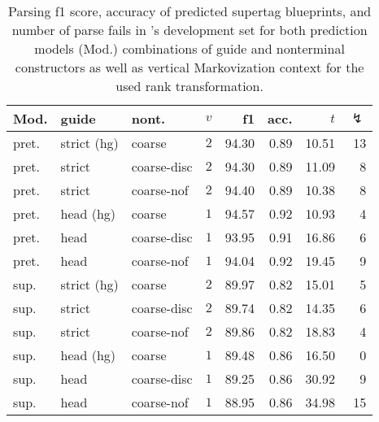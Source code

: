 \documentclass[../../document.tex]{subfiles}
\begin{document}
    \begin{table}
        \caption{\label{tbl:experiments:dptb:dcp}
        Parsing f1 score, accuracy of predicted  supertag blueprints, and number of parse fails in 's development set for both prediction models (Mod.) combinations of guide and nonterminal constructors as well as vertical Markovization context for the used rank transformation.
        }
        \centering
        \setlength{\tabcolsep}{4pt}
        \vspace{.2cm}
        \begin{tabular}{lllc|rrrr}
            \toprule
Mod. &  guide &   nont.   &\(v\)   & f1 & acc. & $t$ & $\lightning$ \\ \hline \rowcolor{black!10}
pret. & strict (hg) &  coarse & \(2\)  & 94.30 & 0.89 & 10.51 & 13  \\\hline
pret. & strict      &  coarse-disc  & \(2\)  & 94.30 & 0.89 & 11.09 & 8  \\
pret. & strict      &  coarse-nof & \(2\)  & 94.40 & 0.89 & 10.38 & 8  \\ \hline\rowcolor{black!10}
pret. & head  (hg)  &  coarse & \(1\)  & 94.57 & 0.92 & 10.93 & 4  \\\hline
pret. & head        &  coarse-disc & \(1\)  & 93.95 & 0.91 & 16.86 & 6  \\
pret. & head        &  coarse-nof & \(1\)  & 94.04 & 0.92 & 19.45 & 9  \\
\midrule \rowcolor{black!10}
sup. & strict (hg) &  coarse & \(2\)  & 89.97 & 0.82 & 15.01 & 5  \\\hline
sup. & strict    &  coarse-disc & \(2\)  & 89.74 & 0.82 & 14.35 & 6  \\
sup. & strict     &  coarse-nof & \(2\)  & 89.86 & 0.82 & 18.83 & 4  \\\hline\rowcolor{black!10}
sup. & head (hg)  &  coarse & \(1\)  & 89.48 & 0.86 & 16.50 & 0  \\\hline
sup. & head      &  coarse-disc & \(1\)  & 89.25 & 0.86 & 30.92 & 9  \\
sup. & head       &  coarse-nof & \(1\)  & 88.95 & 0.86 & 34.98 & 15  \\
    \bottomrule
        \end{tabular}
    \end{table}
\end{document}
